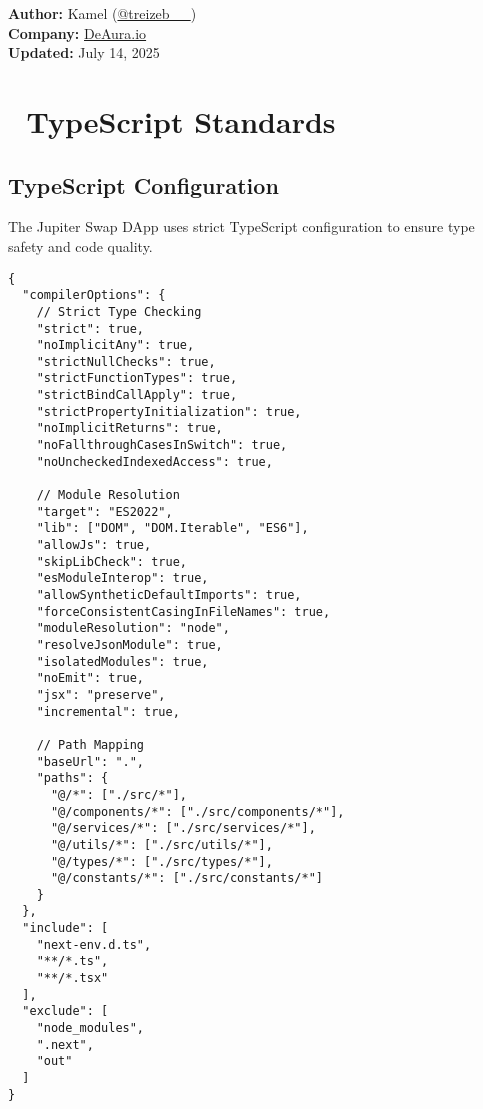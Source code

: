 \documentclass[11pt,a4paper]{article}
\begin{document}
\begin{titlepage}
    \vfill
    
    {\large\textbf{Author:} Kamel (\href{https://x.com/treizeb__}{@treizeb\_\_})\\
    \textbf{Company:} \href{https://deaura.io}{DeAura.io}\\
    \textbf{Updated:} July 14, 2025\par}
\end{titlepage}

\newpage
\tableofcontents
\newpage

\section{📏 TypeScript Standards}

\subsection{TypeScript Configuration}

The Jupiter Swap DApp uses strict TypeScript configuration to ensure type safety and code quality.

\begin{lstlisting}[style=typescript, caption=TypeScript Configuration (tsconfig.json)]
{
  "compilerOptions": {
    // Strict Type Checking
    "strict": true,
    "noImplicitAny": true,
    "strictNullChecks": true,
    "strictFunctionTypes": true,
    "strictBindCallApply": true,
    "strictPropertyInitialization": true,
    "noImplicitReturns": true,
    "noFallthroughCasesInSwitch": true,
    "noUncheckedIndexedAccess": true,
    
    // Module Resolution
    "target": "ES2022",
    "lib": ["DOM", "DOM.Iterable", "ES6"],
    "allowJs": true,
    "skipLibCheck": true,
    "esModuleInterop": true,
    "allowSyntheticDefaultImports": true,
    "forceConsistentCasingInFileNames": true,
    "moduleResolution": "node",
    "resolveJsonModule": true,
    "isolatedModules": true,
    "noEmit": true,
    "jsx": "preserve",
    "incremental": true,
    
    // Path Mapping
    "baseUrl": ".",
    "paths": {
      "@/*": ["./src/*"],
      "@/components/*": ["./src/components/*"],
      "@/services/*": ["./src/services/*"],
      "@/utils/*": ["./src/utils/*"],
      "@/types/*": ["./src/types/*"],
      "@/constants/*": ["./src/constants/*"]
    }
  },
  "include": [
    "next-env.d.ts",
    "**/*.ts",
    "**/*.tsx"
  ],
  "exclude": [
    "node_modules",
    ".next",
    "out"
  ]
}
\end{lstlisting}
\end{document}
